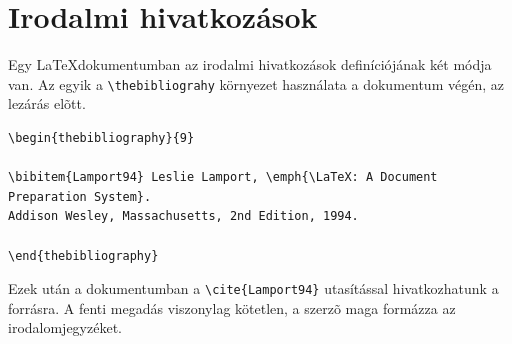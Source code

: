 \section{Irodalmi hivatkozások}\label{sect:HowtoReference}
Egy \LaTeX dokumentumban az irodalmi hivatkozások definíciójának két módja van. Az egyik a \verb+\thebibliograhy+ környezet használata a dokumentum végén, az \verb++ lezárás elõtt.
\begin{lstlisting}[frame=single,float=!ht]
\begin{thebibliography}{9}

\bibitem{Lamport94} Leslie Lamport, \emph{\LaTeX: A Document Preparation System}. 
Addison Wesley, Massachusetts, 2nd Edition, 1994.

\end{thebibliography}
\end{lstlisting}

Ezek után a dokumentumban a \verb+\cite{Lamport94}+ utasítással hivatkozhatunk a forrásra. A fenti megadás viszonylag kötetlen, a szerzõ maga formázza az irodalomjegyzéket. 

